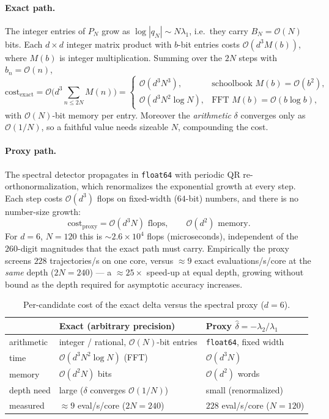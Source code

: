 \documentclass[11pt,a4paper]{article}
\theoremstyle{definition}
\newcommand{\dhat}{\hat{\delta}}
\newcommand{\bigO}{\mathcal{O}}
\begin{document}
\paragraph{Exact path.} The integer entries of $P_N$ grow as $\log|q_N|\sim N\lambda_1$, i.e.\
they carry $B_N=\bigO(N)$ bits. Each $d\times d$ integer matrix product with $b$-bit entries
costs $\bigO(d^3 M(b))$, where $M(b)$ is integer multiplication. Summing over the $2N$ steps
with $b_n=\bigO(n)$,
\[
  \text{cost}_{\text{exact}}
  = \bigO\!\Big(d^3 \textstyle\sum_{n\le 2N} M(n)\Big)
  = \begin{cases}\bigO(d^3 N^3), & \text{schoolbook } M(b)=\bigO(b^2),\\[2pt]
                 \bigO(d^3 N^2\log N), & \text{FFT } M(b)=\bigO(b\log b),\end{cases}
\]
with $\bigO(N)$-bit memory per entry. Moreover the \emph{arithmetic} $\delta$ converges only
as $\bigO(1/N)$, so a faithful value needs sizeable $N$, compounding the cost.
\paragraph{Proxy path.} The spectral detector propagates in \texttt{float64} with periodic
QR re-orthonormalization, which renormalizes the exponential growth at every step. Each step
costs $\bigO(d^3)$ flops on fixed-width ($64$-bit) numbers, and there is no number-size growth:
\[
  \text{cost}_{\text{proxy}} = \bigO(d^3 N) \text{ flops}, \qquad \bigO(d^2)\text{ memory}.
\]
For $d=6$, $N=120$ this is ${\sim}2.6\times10^{4}$ flops (microseconds), independent of the
$260$-digit magnitudes that the exact path must carry. Empirically the proxy screens $228$
trajectories/s on one core, versus ${\approx}9$ exact evaluations/s/core at the \emph{same}
depth ($2N=240$) --- a ${\approx}25\times$ speed-up at equal depth, growing without bound as
the depth required for asymptotic accuracy increases.

\begin{table}[t]\centering
\caption{Per-candidate cost of the exact delta versus the spectral proxy ($d=6$).}
\label{tab:cost}
\begin{tabular}{lll}
\toprule
 & Exact (arbitrary precision) & Proxy $\dhat=-\lambda_2/\lambda_1$ \\
\midrule
arithmetic & integer / rational, $\bigO(N)$-bit entries & \texttt{float64}, fixed width \\
time       & $\bigO(d^3N^2\log N)$ (FFT) & $\bigO(d^3N)$ \\
memory     & $\bigO(d^2N)$ bits & $\bigO(d^2)$ words \\
depth need & large ($\delta$ converges $\bigO(1/N)$) & small (renormalized) \\
measured   & ${\approx}9$ eval/s/core ($2N{=}240$) & $228$ eval/s/core ($N{=}120$) \\
\bottomrule
\end{tabular}
\end{table}
\end{document}
